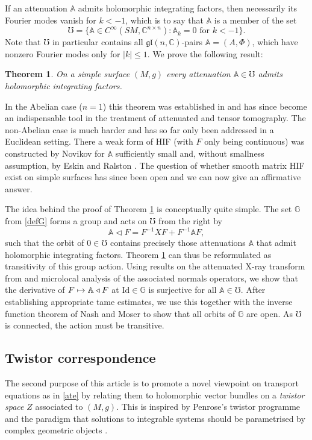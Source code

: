 \documentclass[JEP,XML,SOM,Unicode,published]{cedram}
\newcommand\mto{\mathchoice{\longmapsto}{\mapsto}{\mapsto}{\mapsto}}
\theoremstyle{plain}
\newtheorem{theorem}{Theorem}[section]
\theoremstyle{definition}
\newcommand{\A}{\mathbb{A}}
\newcommand{\G}{\mathbb{G}}
\newcommand{\C}{\mathbb{C}}
\newcommand{\gl}{\mathfrak{gl}}
\newcommand{\Id}{\mathrm{Id}}
\newcommand{\1}{{\bf 1}}
\let\act\triangleleft
\begin{document}
If an attenuation $\A$ admits holomorphic integrating factors, then necessarily its Fourier modes vanish for $k<-1$, which is to say that $\A$ is a member of the set
\begin{equation}\label{defmho}
\mho=\{\A\in C^\infty(SM,\C^{n\times n}): \A_k=0 \text{ for } k<-1\}.
\end{equation}
Note that $\mho$ in particular contains all $\gl(n,\C)$-pairs $\A=(A,\Phi)$, which have nonzero Fourier modes only for $\vert k \vert \le 1$.
We prove the following result:

\begin{theorem}\label{mainhif}
On a simple surface $(M,g)$ every attenuation $\A\in \mho$ admits holomorphic integrating factors.
\end{theorem}

In the Abelian case ($n=1$) this theorem was established in \cite{SaUh11} and has since become an indispensable tool in the treatment of attenuated and tensor tomography. The non-Abelian case is much harder and has so far only been addressed in a Euclidean setting. There a weak form of HIF (with $F$ only being continuous) was constructed by Novikov \cite{Nov02} for $\A$ sufficiently small and, without smallness assumption, by Eskin and Ralston \cite{EsRa04}. The question of whether smooth matrix HIF exist on simple surfaces has since been open and we can now give an affirmative answer.

The idea behind the proof of Theorem \ref{mainhif} is conceptually quite simple. The set $\G$ from \eqref{defG} forms a group and acts on $\mho$ from the right by
\begin{equation}\label{rule}
\A\act F = F^{-1} XF + F^{-1} \A F,
\end{equation}
such that the orbit of $0\in \mho$ contains precisely those attenuations $\A$ that admit holomorphic integrating factors.
Theorem \ref{mainhif} can thus be reformulated as transitivity of this group action. Using results on the attenuated X-ray transform from \cite{PSU12,PaSa20} and microlocal analysis of the associated normals operators,
we show that the derivative of $F\mto \A\act F$ at $\Id \in \G$ is surjective for all $\A\in \mho$. After establishing appropriate tame estimates, we use this together with the inverse function theorem of Nash and Moser to show that all orbits of $\G$ are open. As $\mho$ is connected, the action must be transitive.

\subsection{Twistor correspondence} \label{twistorintro} The second purpose of this article is to promote a novel viewpoint on transport equations as in \eqref{ate} by relating them to holomorphic vector bundles on a \emph{twistor space} $Z$ associated to $(M,g)$. This is inspired by Penrose's twistor programme \cite{Pen77} and the paradigm that solutions to integrable systems should be parametrised by complex geometric objects \cite{AHS78,LeB80, Hit80,MaWo96}.
\end{document}
